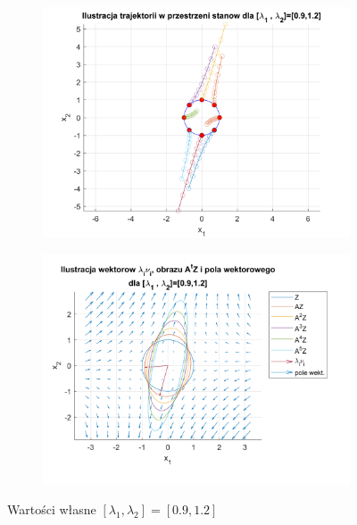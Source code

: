 \documentclass{article}
\begin{document}
\begin{figure}[H]
    \centering
    \begin{subfigure}{0.44\textwidth}
        \includegraphics[width=\textwidth]{portret_fazowy_9_12.png}
    \end{subfigure}
    \begin{subfigure}{0.48\textwidth}
        \includegraphics[width=\textwidth]{pole_wektorowe_9_12.png}
    \end{subfigure}
    \caption{Warto\'sci własne $[ \lambda_1, \lambda_2 ]= [ 0.9, 1.2 ]$}
    \label{fig::9i12}
\end{figure}
\end{document}
